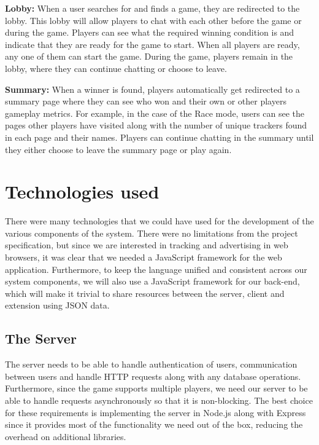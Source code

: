 \documentclass{l4proj}
\begin{document}
\textbf{Lobby:} When a user searches for and finds a game, they are redirected to the lobby. This lobby will allow players to chat with each other before the game or during the game. Players can see what the required winning condition is and indicate that they are ready for the game to start. When all players are ready, any one of them can start the game. During the game, players remain in the lobby, where they can continue chatting or choose to leave.

\textbf{Summary:} When a winner is found, players automatically get redirected to a summary page where they can see who won and their own or other players gameplay metrics. For example, in the case of the Race mode, users can see the pages other players have visited along with the number of unique trackers found in each page and their names. Players can continue chatting in the summary until they either choose to leave the summary page or play again. 

\section{Technologies used}
There were many technologies that we could have used for the development of the various components of the system. There were no limitations from the project specification, but since we are interested in tracking and 
advertising in web browsers, it was clear that we needed a JavaScript framework for the web application. Furthermore, to keep the language unified and consistent across our system components, we will also use a JavaScript framework for our
back-end, which will make it trivial to share resources between the server, client and extension using JSON data. 

\subsection{The Server}
The server needs to be able to handle authentication of users, communication between users and handle HTTP requests along with any database operations. Furthermore, since the game supports multiple players, we need
our server to be able to handle requests asynchronously so that it is non-blocking. The best choice for these requirements is implementing the server in Node.js along with Express since it provides most of the functionality we need out of the box, reducing the overhead
on additional libraries.  
\end{document}
